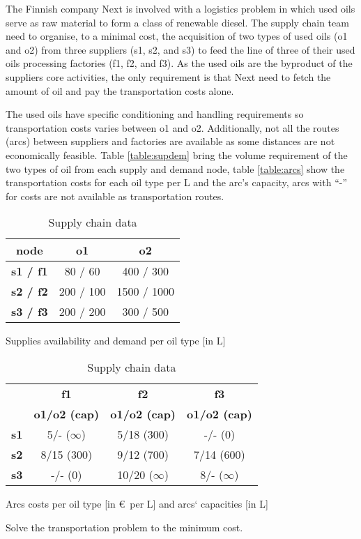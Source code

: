 The Finnish company Next is involved with a logistics problem in which used oils serve as raw material to form a class of renewable diesel. The supply chain team need to organise, to a minimal cost, the acquisition of two types of used oils (o1 and o2) from three suppliers (s1, s2, and s3) to feed the line of three of their used oils processing factories (f1, f2, and f3). As the used oils are the byproduct of the suppliers core activities, the only requirement is that Next need to fetch the amount of oil and pay the transportation costs alone.

The used oils have specific conditioning and handling requirements so transportation costs varies between o1 and o2. Additionally, not all the routes (arcs) between suppliers and factories are available as some distances are not economically feasible. Table \ref{table:supdem} bring the volume requirement of the two types of oil from each supply and demand node, table \ref{table:arcs} show the transportation costs for each oil type per L and the arc's capacity, arcs with ``-'' for costs are not available as transportation routes.


\begin{table}[h!]
	\begin{subtable}[h]{0.4\textwidth}
		\begin{center}
		\begin{tabular}{c|cc}
			\textbf{node} & \textbf{o1} & \textbf{o2} \\
			\hline
			\textbf{s1 / f1} & 80 / 60 & 400 / 300 \\
			\textbf{s2 / f2} & 200 / 100 & 1500 / 1000 \\
			\textbf{s3 / f3} & 200 / 200 & 300 / 500 \\
		\end{tabular}
		\end{center}
		\caption{Supplies availability and demand per oil type [in L]}
		\label{table:supdem}
	\end{subtable}
	\hfill
	\begin{subtable}[h]{0.55\textwidth}
		\begin{center}
			\begin{tabular}{c|ccc}
				 & \textbf{f1} & \textbf{f2} & \textbf{f3}\\
				 & \textbf{o1/o2 (cap)} & \textbf{o1/o2 (cap)} & \textbf{o1/o2 (cap)}\\
				\hline
				\textbf{s1} & 5/- ($\infty$) & 5/18 (300) & -/- (0)\\
				\textbf{s2} & 8/15 (300) & 9/12 (700) & 7/14 (600)\\
				\textbf{s3} & -/- (0) & 10/20 ($\infty$) & 8/- ($\infty$)\\
			\end{tabular}
		\end{center}
		\caption{Arcs costs per oil type [in \euro \ per L] and arcs` capacities [in L]}
		\label{table:arcs}
	\end{subtable}
	\caption{Supply chain data}
	\label{table:sc}
\end{table}

Solve the transportation problem to the minimum cost.